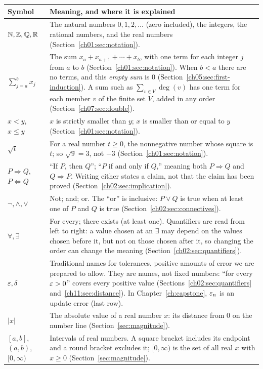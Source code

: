 \begin{longtable}{@{}p{1.25in}p{3.95in}@{}}
\toprule Symbol & Meaning, and where it is explained\\\midrule\endhead
$\mathbb N,\mathbb Z,\mathbb Q,\mathbb R$ & The natural numbers $0,1,2,\ldots$ (zero included), the integers, the rational numbers, and the real numbers (Section~\ref{ch01:sec:notation}).\\
$\sum_{j=a}^{b}x_j$ & The sum $x_a+x_{a+1}+\cdots+x_b$, with one term for each integer $j$ from $a$ to $b$ (Section~\ref{ch01:sec:notation}). When $b<a$ there are no terms, and this \emph{empty sum} is $0$ (Section~\ref{ch05:sec:first-induction}). A sum such as $\sum_{v\in V}\deg(v)$ has one term for each member $v$ of the finite set $V$, added in any order (Section~\ref{ch07:sec:double}).\\
$x<y$, $x\le y$ & $x$ is strictly smaller than $y$; $x$ is smaller than or equal to $y$ (Section~\ref{ch01:sec:notation}).\\
$\sqrt t$ & For a real number $t\ge0$, the nonnegative number whose square is $t$; so $\sqrt9=3$, not $-3$ (Section~\ref{ch01:sec:notation}).\\
$P\Rightarrow Q$, $P\Leftrightarrow Q$ & ``If $P$, then $Q$''; ``$P$ if and only if $Q$,'' meaning both $P\Rightarrow Q$ and $Q\Rightarrow P$. Writing either states a claim, not that the claim has been proved (Section~\ref{ch02:sec:implication}).\\
$\neg,\land,\lor$ & Not; and; or. The ``or'' is inclusive: $P\lor Q$ is true when at least one of $P$ and $Q$ is true (Section~\ref{ch02:sec:connectives}).\\
$\forall,\exists$ & For every; there exists (at least one). Quantifiers are read from left to right: a value chosen at an $\exists$ may depend on the values chosen before it, but not on those chosen after it, so changing the order can change the meaning (Section~\ref{ch02:sec:quantifiers}).\\
$\varepsilon,\delta$ & Traditional names for tolerances, positive amounts of error we are prepared to allow. They are names, not fixed numbers: ``for every $\varepsilon>0$'' covers every positive value (Sections~\ref{ch02:sec:quantifiers} and~\ref{ch11:sec:distance}). In Chapter~\ref{ch:capstone}, $\varepsilon_n$ is an update error (last row).\\
$|x|$ & The absolute value of a real number $x$: its distance from $0$ on the number line (Section~\ref{sec:magnitude}).\\
$[a,b]$, $(a,b)$, $[0,\infty)$ & Intervals of real numbers. A square bracket includes its endpoint and a round bracket excludes it; $[0,\infty)$ is the set of all real $x$ with $x\ge0$ (Section~\ref{sec:magnitude}).\\

\end{longtable}
